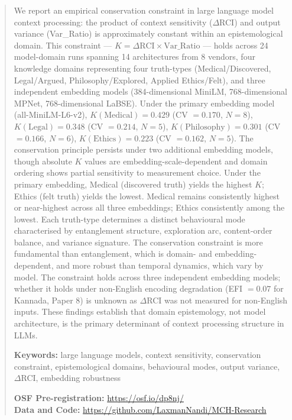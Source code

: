\documentclass[11pt,a4paper]{article}
\begin{document}
\begin{abstract}
\noindent We report an empirical conservation constraint in large language model context
processing: the product of context sensitivity ($\Delta$RCI) and output variance
(Var\_Ratio) is approximately constant within an epistemological domain. This constraint
--- $K = \Delta\text{RCI} \times \text{Var\_Ratio}$ --- holds across 24 model-domain
runs spanning 14 architectures from 8 vendors, four knowledge domains representing four
truth-types (Medical/Discovered, Legal/Argued, Philosophy/Explored, Applied Ethics/Felt),
and three independent embedding models (384-dimensional MiniLM, 768-dimensional MPNet,
768-dimensional LaBSE). Under the primary embedding model (all-MiniLM-L6-v2),
$K(\text{Medical}) = 0.429$ (CV $= 0.170$, $N = 8$), $K(\text{Legal}) = 0.348$
(CV $= 0.214$, $N = 5$), $K(\text{Philosophy}) = 0.301$ (CV $= 0.166$, $N = 6$),
$K(\text{Ethics}) = 0.223$ (CV $= 0.162$, $N = 5$). The conservation principle persists
under two additional embedding models, though absolute $K$ values are
embedding-scale-dependent and domain ordering shows partial sensitivity to measurement
choice. Under the primary embedding, Medical (discovered truth) yields the highest $K$;
Ethics (felt truth) yields the lowest. Medical remains consistently highest or near-highest
across all three embeddings; Ethics consistently among the lowest. Each truth-type determines a distinct behavioural
mode characterised by entanglement structure, exploration arc, content-order balance, and
variance signature. The conservation constraint is more fundamental than entanglement,
which is domain- and embedding-dependent, and more robust than temporal dynamics, which
vary by model. The constraint holds across three independent embedding models; whether it holds
under non-English encoding degradation (EFI $= 0.07$ for Kannada, Paper 8) is
unknown as $\Delta$RCI was not measured for non-English inputs. These findings establish that domain epistemology, not
model architecture, is the primary determinant of context processing structure in LLMs.

\vspace{0.5em}
\noindent\textbf{Keywords:} large language models, context sensitivity, conservation
constraint, epistemological domains, behavioural modes, output variance, $\Delta$RCI,
embedding robustness

\vspace{0.5em}
\noindent\textbf{OSF Pre-registration:} \url{https://osf.io/dp8nj/}\\
\noindent\textbf{Data and Code:} \url{https://github.com/LaxmanNandi/MCH-Research}
\end{abstract}
\end{document}
